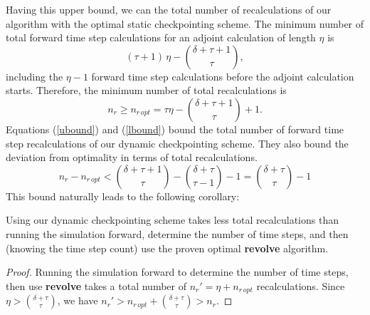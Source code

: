 Having this upper bound, we can the total number of recalculations
of our algorithm with the optimal static checkpointing scheme.
The minimum number of total forward time step calculations for an adjoint
calculation of length $\eta$ is \cite[]{griewank00}
\[ (\tau + 1)\, \eta - \binom{\delta + \tau + 1}{\tau}, \]
including the $\eta - 1$ forward time step calculations before the adjoint
calculation starts.  Therefore, the minimum number of total recalculations is
\begin{equation} \label{lbound}
n_r \ge n_{r\,opt} = \tau \eta - \binom{\delta + \tau + 1}{\tau} + 1.
\end{equation}
Equations (\ref{ubound}) and (\ref{lbound}) bound the total number of forward
time step recalculations of our dynamic checkpointing scheme.  They also
bound the deviation from optimality in terms of total recalculations.
\[ n_r - n_{r\,opt} < \binom{\delta + \tau + 1}{\tau}
  - \binom{\delta + \tau}{\tau - 1} - 1 = \binom{\delta + \tau}{\tau} - 1 \]
This bound naturally leads to the following corollary:
\begin{corollary} \label{cor3}
Using our dynamic checkpointing scheme takes less total recalculations
than running the simulation forward, determine the number of time steps, and
then (knowing the time step count) use the proven optimal {\bf revolve}
algorithm.
\end{corollary}
\begin{proof}
Running the simulation forward to determine the number of time steps,
then use {\bf revolve} takes a total number of $n_r' = \eta + n_{r\,opt}$
recalculations.  Since $\eta > \binom{\delta + \tau}{\tau}$, we have
$n_r' > n_{r\,opt} + \binom{\delta + \tau}{\tau} > n_r$.
\end{proof}

